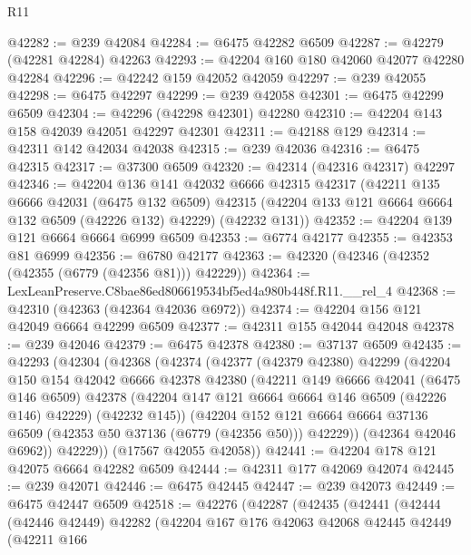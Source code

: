 \begin{lexlean}{R11}
\begin{coremodule}
@42282 := @239 @42084
@42284 := @6475 @42282 @6509
@42287 := @42279 (@42281 @42284) @42263
@42293 := @42204 @160 @180 @42060 @42077 @42280 @42284
@42296 := @42242 @159 @42052 @42059
@42297 := @239 @42055
@42298 := @6475 @42297
@42299 := @239 @42058
@42301 := @6475 @42299 @6509
@42304 := @42296 (@42298 @42301) @42280
@42310 := @42204 @143 @158 @42039 @42051 @42297 @42301
@42311 := @42188 @129
@42314 := @42311 @142 @42034 @42038
@42315 := @239 @42036
@42316 := @6475 @42315
@42317 := @37300 @6509
@42320 := @42314 (@42316 @42317) @42297
@42346 := @42204
    @136
    @141
    @42032
    @6666
    @42315
    @42317
    (@42211
      @135
      @6666
      @42031
      (@6475 @132 @6509)
      @42315
      (@42204 @133 @121 @6664 @6664 @132 @6509 (@42226 @132) @42229)
      (@42232 @131))
@42352 := @42204 @139 @121 @6664 @6664 @6999 @6509
@42353 := @6774 @42177
@42355 := @42353 @81 @6999
@42356 := @6780 @42177
@42363 := @42320 (@42346 (@42352 (@42355 (@6779 (@42356 @81))) @42229))
@42364 := LexLeanPreserve.C8bae86ed806619534bf5ed4a980b448f.R11.__rel_4
@42368 := @42310 (@42363 (@42364 @42036 @6972))
@42374 := @42204 @156 @121 @42049 @6664 @42299 @6509
@42377 := @42311 @155 @42044 @42048
@42378 := @239 @42046
@42379 := @6475 @42378
@42380 := @37137 @6509
@42435 := @42293
    (@42304
      (@42368
        (@42374
          (@42377
            (@42379 @42380)
            @42299
            (@42204
              @150
              @154
              @42042
              @6666
              @42378
              @42380
              (@42211
                @149
                @6666
                @42041
                (@6475 @146 @6509)
                @42378
                (@42204 @147 @121 @6664 @6664 @146 @6509 (@42226 @146) @42229)
                (@42232 @145))
              (@42204
                @152
                @121
                @6664
                @6664
                @37136
                @6509
                (@42353 @50 @37136 (@6779 (@42356 @50)))
                @42229))
            (@42364 @42046 @6962))
          @42229))
      (@17567 @42055 @42058))
@42441 := @42204 @178 @121 @42075 @6664 @42282 @6509
@42444 := @42311 @177 @42069 @42074
@42445 := @239 @42071
@42446 := @6475 @42445
@42447 := @239 @42073
@42449 := @6475 @42447 @6509
@42518 := @42276
    (@42287
      (@42435
        (@42441
          (@42444
            (@42446 @42449)
            @42282
            (@42204
              @167
              @176
              @42063
              @42068
              @42445
              @42449
              (@42211
                @166

\end{coremodule}
\end{lexlean}
